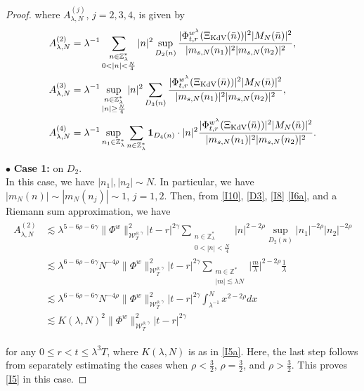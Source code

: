 \documentclass[letterpaper, 11pt,  reqno]{amsart}
\newcommand{\1}{\hspace{0.5mm}\text{I}\hspace{0.5mm}}
\newcommand{\noi}{\noindent}
\newcommand{\Z}{\mathbb{Z}}
\newcommand{\g}{\gamma}
\newcommand{\ld}{\lambda}
\newcommand{\les}{\lesssim}
\newcommand{\ind}{\mathbf 1}
\newcommand{\W}{\mathcal{W}}
\newcommand{\KDV}{\text{\rm KdV} }
\numberwithin{equation}{section}
\numberwithin{theorem}{section}
\begin{document}
\begin{proof}
\noi
where $A_{\ld, N}^{(j)}$, $j = 2, 3, 4$, is given by 
\begin{align}
A_{\ld, N}^{(2)}
& =
\ld^{-1} \sum_{\substack{n\in \Z_\ld^*\\0 < |n|<  \frac N4 }} |n|^2 \sup_{D_2(n)} 
\frac{ |\Phi^{w^\ld}_{t,r}(\Xi_\KDV(\bar n))|^2 |M_N(\bar n)|^2}{|m_{s, N}(n_1)|^2 |m_{s, N}(n_2)|^2},
\label{I10}\\
A_{\ld, N}^{(3)}
& =
 \ld^{-1}\sup_{\substack{n\in \Z_\ld^*\\|n|\geq \frac N4}} |n|^2\sum_{D_3(n)}
 \frac{|\Phi^{w^\ld}_{t,r}(\Xi_\KDV(\bar n)) |^2  |M_N(\bar n)|^2 }{ |m_{s, N}(n_1)|^2|m_{s, N}(n_2)|^2},
\label{I11}\\
A_{\ld, N}^{(4)}
& =
\ld^{-1} 
\sup_{n_1 \in \Z_\ld^*} 
\sum_{n\in \Z_\ld^*} 
\ind_{D_4(n)}\cdot |n|^2 
\frac{ |\Phi^{w^\ld}_{t,r}(\Xi_\KDV(\bar n))|^2 |M_N(\bar n)|^2}{|m_{s, N}(n_1)|^2 |m_{s, N}(n_2)|^2}.
\label{I11a}
\end{align}








\medskip

\noi
$\bullet$ \textbf{Case 1:} on  $D_2$.\\
\indent
In this case, we have $|n_1|,   |n_2| \sim N$.
In particular, we have $|m_N(n)| \sim |m_N(n_j)| \sim 1$, $j = 1, 2$.
Then, from \eqref{I10}, \eqref{D3}, \eqref{I8} \eqref{I6a}, 
and a Riemann sum approximation,  we have 
\begin{align}
\begin{aligned}
A_{\ld, N}^{(2)}
&\les 
\ld^{5- 6\rho-6\g}
 \| \Phi^{w} \|^2_{\W_{T}^{\rho, \g}}  
|t-r|^{2\g}
 \sum_{\substack{n\in \Z_\ld^*\\0< |n|<  \frac N4}} |n|^{2-2\rho}
\sup_{D_2(n)}  |n_1|^{-2\rho}|n_2|^{-2\rho} \\
&\les 
\ld^{6- 6\rho-6\g}N^{-4\rho}
 \| \Phi^{w} \|^2_{\W_{T}^{\rho, \g}}  
|t-r|^{2\g}
  \sum_{\substack{m \in \Z^*\\ |m|\les \ld N}} 
 \Big|\frac m\ld \Big|^{2-2\rho}\frac 1\ld\\
&\les 
\ld^{6- 6\rho-6\g}N^{-4\rho}
 \| \Phi^{w} \|^2_{\W_{T}^{\rho, \g}}  
|t-r|^{2\g}
\int_{\ld^{-1}}^N x^{2- 2\rho} dx\\
 &\les 
K(\ld, N)^2
 \| \Phi^{w} \|^2_{\W_{T}^{\rho, \g}}  
|t-r|^{2\g}
\end{aligned}
\label{I11b}
\end{align}

\noi
for any $0\leq r<t\leq \ld^3T$, 
where $K(\ld, N)$ is as in \eqref{I5a}. 
Here, the last step follows
from separately estimating 
the cases when $\rho < \frac 32$, 
$\rho = \frac 32$, 
and $\rho > \frac 32$.
This proves
 \eqref{I5} in this case.


\end{proof}
\end{document}
